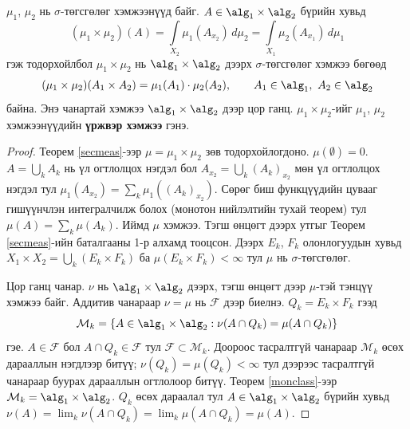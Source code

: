 \begin{thm}\label{prodmeas}
$\mu_1$, $\mu_2$ нь $\sigma$-төгсгөлөг хэмжээнүүд байг. $A\in\alg_1\times\alg_2$ бүрийн хувьд
$$(\mu_1\times\mu_2)(A)=\int\limits_{X_2}\mu_1(A_{x_2})\,d\mu_2=\int\limits_{X_1}\mu_2(A_{x_1})\,d\mu_1$$
гэж тодорхойлбол $\mu_1\times\mu_2$ нь $\alg_1\times\alg_2$ дээрх $\sigma$-төгсгөлөг хэмжээ бөгөөд
$$(\mu_1\times\mu_2)(A_1\times A_2)=\mu_1(A_1)\cdot\mu_2(A_2),\qquad A_1\in\alg_1,\ A_2\in\alg_2$$
байна. Энэ чанартай хэмжээ $\alg_1\times\alg_2$ дээр цор ганц. $\mu_1\times\mu_2$-ийг $\mu_1$, $\mu_2$ хэмжээнүүдийн \textbf{үржвэр хэмжээ} гэнэ.
\end{thm}
\begin{proof}
Теорем \ref{secmeas}-ээр $\mu=\mu_1\times\mu_2$ зөв тодорхойлогдоно. $\mu(\emptyset)=0$. $A=\bigcup_kA_k$ нь үл огтлолцох нэгдэл бол $A_{x_2}=\bigcup_k(A_k)_{x_2}$ мөн үл огтлолцох нэгдэл тул $\mu_1(A_{x_2})=\sum_k\mu_1((A_k)_{x_2})$. Сөрөг биш функцүүдийн цувааг гишүүнчлэн интегралчилж болох (монотон нийлэлтийн тухай теорем) тул $\mu(A)=\sum_k\mu(A_k)$. Иймд $\mu$ хэмжээ. Тэгш өнцөгт дээрх утгыг Теорем \ref{secmeas}-ийн баталгааны 1-р алхамд тооцсон. Дээрх $E_k$, $F_k$ олонлогуудын хувьд $X_1\times X_2=\bigcup_k(E_k\times F_k)$ ба $\mu(E_k\times F_k)<\infty$ тул $\mu$ нь $\sigma$-төгсгөлөг.

Цор ганц чанар. $\nu$ нь $\alg_1\times\alg_2$ дээрх, тэгш өнцөгт дээр $\mu$-тэй тэнцүү хэмжээ байг. Аддитив чанараар $\nu=\mu$ нь $\mathcal{F}$ дээр биелнэ. $Q_k=E_k\times F_k$ гээд
$$\mathcal{M}_k=\{A\in\alg_1\times\alg_2: \nu(A\cap Q_k)=\mu(A\cap Q_k)\}$$
гэе. $A\in\mathcal{F}$ бол $A\cap Q_k\in\mathcal{F}$ тул $\mathcal{F}\subset\mathcal{M}_k$. Доороос тасралтгүй чанараар $\mathcal{M}_k$ өсөх дарааллын нэгдлээр битүү; $\nu(Q_k)=\mu(Q_k)<\infty$ тул дээрээс тасралтгүй чанараар буурах дарааллын огтлолоор битүү. Теорем \ref{monclass}-ээр $\mathcal{M}_k=\alg_1\times\alg_2$. $Q_k$ өсөх дараалал тул $A\in\alg_1\times\alg_2$ бүрийн хувьд $\nu(A)=\lim_k\nu(A\cap Q_k)=\lim_k\mu(A\cap Q_k)=\mu(A)$.
\end{proof}
